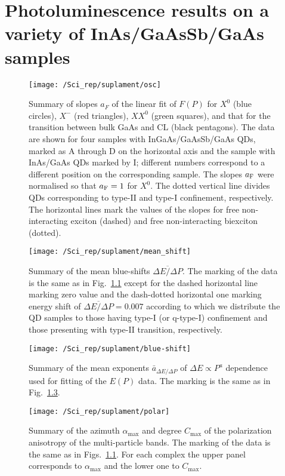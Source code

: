\chapter{Photoluminescence results on a variety of InAs/GaAsSb/GaAs samples}


\label{chapter:appendix_SciRep}
\begin{figure}
	\centering
	\texttt{[image: /Sci\_rep/suplament/osc]}
	\caption{Summary of slopes $a_F$ of the linear fit of $F(P)$ for $X^0$ (blue circles), $X^-$ (red triangles), $XX^0$ (green squares), and that for the transition between bulk GaAs and CL (black pentagons). The data are shown for four samples with InGaAs/GaAsSb/GaAs QDs, marked as A through D on the horizontal axis and the sample with InAs/GaAs QDs marked by I; different numbers correspond to a different position on the corresponding sample. The slopes $a_{\rm F}$ were normalised so that $a_{\rm F}=1$ for $X^0$. The dotted vertical line divides QDs corresponding to type-II and type-I confinement, respectively. The horizontal lines mark the values of the slopes for free non-interacting exciton (dashed) and free non-interacting biexciton (dotted).}
	\label{fig:sup:osc_slope}
\end{figure}




\begin{figure}[!ht]
	\centering
	\texttt{[image: /Sci\_rep/suplament/mean\_shift]}
	\caption{Summary of the mean blue-shifts $\overline{\Delta E/\Delta P}$. The marking of the data is the same as in Fig.~\ref{fig:sup:osc_slope} except for the dashed horizontal line marking zero value and the dash-dotted horizontal one marking energy shift of $\overline{\Delta E/\Delta P}=0.007$ according to which we distribute the QD samples to those having type-I (or q-type-I) confinement and those presenting with type-II transition, respectively.}
	\label{fig:sup:mean_blueshift}
\end{figure}

\begin{figure}[!h]
	\centering
	\texttt{[image: /Sci\_rep/suplament/blue-shift]}
	\caption{Summary of the mean exponents $\bar{a}_{\Delta E/\Delta P}$ of $\Delta E\propto P^a$ dependence used for fitting of the $E(P)$ data. The marking is the same as in Fig.~\ref{fig:sup:mean_a_blueshift}.}
	\label{fig:sup:mean_a_blueshift}
\end{figure}



\begin{figure}
	\centering
	\texttt{[image: /Sci\_rep/suplament/polar]}
	\caption{Summary of the azimuth $\alpha_{\mathrm{max}}$ and degree $C_{\mathrm{max}}$ of the polarization anisotropy of the multi-particle bands. The marking of the data is the same as in Figs.~\ref{fig:sup:osc_slope}. For each complex the upper panel corresponds to $\alpha_{\mathrm{max}}$ and the lower one to $C_{\mathrm{max}}$.}
	\label{fig:sup:pol}
\end{figure}
\newpage 